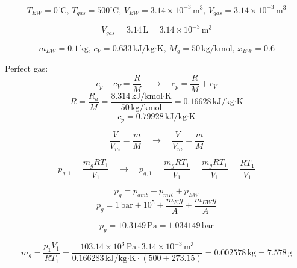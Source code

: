 \[ T_{EW} = 0^\circ \text{C}, \, T_{gas} = 500^\circ \text{C}, \, V_{EW} = 3.14 \times 10^{-3} \, \text{m}^3, \, V_{gas} = 3.14 \times 10^{-3} \, \text{m}^3 \]  

\[ V_{gas} = 3.14 \, \text{L} = 3.14 \times 10^{-3} \, \text{m}^3 \]  

\[ m_{EW} = 0.1 \, \text{kg}, \, c_V = 0.633 \, \text{kJ/kg·K}, \, M_g = 50 \, \text{kg/kmol}, \, x_{EW} = 0.6 \]  

Perfect gas:  
\[ c_p - c_V = \frac{R}{M} \quad \rightarrow \quad c_p = \frac{R}{M} + c_V \]  
\[ R = \frac{R_u}{M} = \frac{8.314 \, \text{kJ/kmol·K}}{50 \, \text{kg/kmol}} = 0.16628 \, \text{kJ/kg·K} \]  
\[ c_p = 0.79928 \, \text{kJ/kg·K} \]  

\[ \frac{V}{V_m} = \frac{m}{M} \quad \rightarrow \quad \frac{V}{V_m} = \frac{m}{M} \]  

\[ p_{g,1} = \frac{m_g R T_1}{V_1} \quad \rightarrow \quad p_{g,1} = \frac{m_g R T_1}{V_1} = \frac{m_g R T_1}{V_1} = \frac{R T_1}{V_1} \]  

\[ p_{g} = p_{amb} + p_{mK} + p_{EW} \]  
\[ p_{g} = 1 \, \text{bar} + 10^5 + \frac{m_{K} g}{A} + \frac{m_{EW} g}{A} \]  

\[ p_{g} = 10.3149 \, \text{Pa} = 1.034149 \, \text{bar} \]  

\[ m_g = \frac{p_1 V_1}{R T_1} = \frac{103.14 \times 10^3 \, \text{Pa} \cdot 3.14 \times 10^{-3} \, \text{m}^3}{0.166283 \, \text{kJ/kg·K} \cdot (500 + 273.15)} = 0.002578 \, \text{kg} = 7.578 \, \text{g} \]